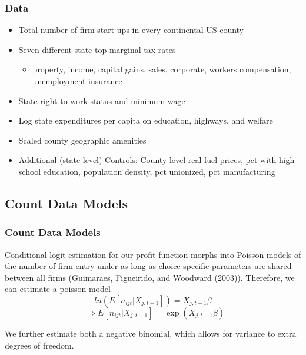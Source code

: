 \documentclass{beamer}
\begin{document}
\begin{frame}
\frametitle{Data}
\begin{itemize}
\item Total number of firm start ups in every continental US county
\item Seven different state top marginal tax rates
\begin{itemize}
\item property, income, capital gains, sales, corporate, workers compensation, unemployment insurance
\end{itemize}
\item State right to work status and minimum wage
\item Log state expenditures per capita on education, highways, and welfare
\item Scaled county geographic amenities
\item Additional (state level) Controls: County level real fuel prices, pct with high school  education, population density, pct unionized, pct manufacturing
\end{itemize}
\end{frame} 


\begin{frame}
\subsection{Count Data Models}
\frametitle{Count Data Models}
Conditional logit estimation for our profit function morphs into Poisson models of the number of firm entry under as long as choice-specific parameters are shared between all firms (Guimaraes, Figueirido, and Woodward (2003)). Therefore, we can estimate a poisson model
\begin{equation} \label{pois}
ln(E[n_{ijt}|X_{j,t-1}]) = X_{j,t-1}\beta
\end{equation}
$$\implies E[n_{ijt}|X_{j,t-1}] = \exp(X_{j,t-1}\beta)$$

We further estimate both a negative binomial, which allows for variance to extra degrees of freedom.
\end{frame}
\end{document}
